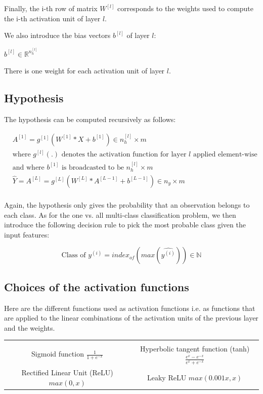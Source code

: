 \documentclass[a4paper, 12pt]{article}
\begin{document}
Finally, the i-th row of matrix $W^{[l]}$ corresponds to the weights used to compute the i-th activation unit of layer $l$.

We also introduce the bias vectors $b^{[l]}$ of layer $l$:

$b^{[l]} \in \mathbb{R}^{n_h^{[l]}}$

There is one weight for each activation unit of layer $l$.

\subsection{Hypothesis}

The hypothesis can be computed recursively as follows:

\begin{align*}
& A^{[1]} = g^{[1]}\left( W^{[1]} * X + b^{[1]} \right) \in n_h^{[l]} \times m \\
& \text{where } g^{[l]}(.) \text{ denotes the activation function for layer } l \text{ applied element-wise} \\
& \text{and where } b^{[1]}  \text{ is broadcasted to be } n_h^{[l]} \times m \\
& \hat{Y} = A^{[L]} = g^{[L]}\left( W^{[L]} * A^{[L-1]} + b^{[L-1]} \right) \in n_y \times m \\
\end{align*}

Again, the hypothesis only gives the probability that an observation belongs to each class. As for the one vs. all multi-class classification problem, we then introduce the following decision rule to pick the most probable class given the input features:

\begin{equation}
\text{Class of } y^{(i)} = index_{of}\left( max(\hat{y^{(i)}}) \right) \in \mathbb{N}
\end{equation}

\subsection{Choices of the activation functions}

Here are the different functions used as activation functions i.e. as functions that are applied to the linear combinations of the activation units of the previous layer and the weights.

\begin{center}
\begin{tabular}{ | c | c | }
 \hline \\
 \makecell{Sigmoid function \\
 $ \frac{1}{1+e^{-x}}$
 }
 & \makecell{Hyperbolic tangent function (tanh) \\
 $ \frac{e^{x} - e^{-x}}{e^{x} + e^{-x}}$
 } \\ 
 \hline
\makecell{Rectified Linear Unit (ReLU) \\
$ max(0, x)$
} & \makecell{Leaky ReLU \\
$max(0.001x, x)$
} \\
\hline
\end{tabular}
\end{center}
\end{document}
